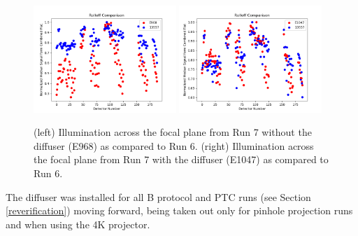 \begin{figure}[htbp]
\centering
\includegraphics[width=0.48\textwidth]{figures/Run7_Illumination.png}
\includegraphics[width=0.48\textwidth]{figures/Run7_DiffuserIllumination.png}
\caption{(left) Illumination across the focal plane from Run 7 without the diffuser (E968) as compared to Run 6. (right) Illumination across the focal plane from Run 7 with the diffuser (E1047) as compared to Run 6.}
\label{fig:roll-off}
\end{figure}



The diffuser was installed for all B protocol and PTC runs (see Section \ref{reverification}) moving forward, being taken out only for pinhole projection runs and when using the 4K projector.

